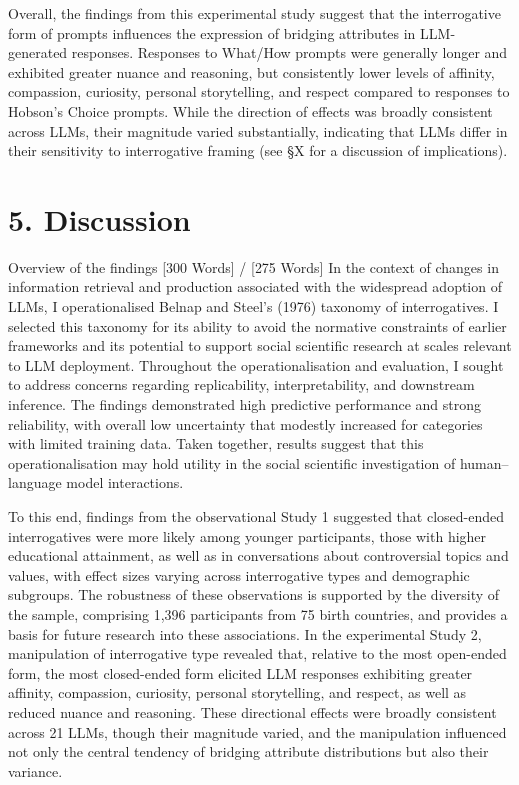\documentclass[
  12pt,
]{article}
\begin{document}
Overall, the findings from this experimental study suggest that the interrogative form of prompts influences the expression of bridging attributes in LLM-generated responses. Responses to What/How prompts were generally longer and exhibited greater nuance and reasoning, but consistently lower levels of affinity, compassion, curiosity, personal storytelling, and respect compared to responses to Hobson's Choice prompts. While the direction of effects was broadly consistent across LLMs, their magnitude varied substantially, indicating that LLMs differ in their sensitivity to interrogative framing (see §X for a discussion of implications).

\section{5. Discussion}\label{discussion}

Overview of the findings {[}300 Words{]} / {[}275 Words{]}
In the context of changes in information retrieval and production associated with the widespread adoption of LLMs, I operationalised Belnap and Steel's (1976) taxonomy of interrogatives. I selected this taxonomy for its ability to avoid the normative constraints of earlier frameworks and its potential to support social scientific research at scales relevant to LLM deployment. Throughout the operationalisation and evaluation, I sought to address concerns regarding replicability, interpretability, and downstream inference. The findings demonstrated high predictive performance and strong reliability, with overall low uncertainty that modestly increased for categories with limited training data. Taken together, results suggest that this operationalisation may hold utility in the social scientific investigation of human--language model interactions.

To this end, findings from the observational Study 1 suggested that closed-ended interrogatives were more likely among younger participants, those with higher educational attainment, as well as in conversations about controversial topics and values, with effect sizes varying across interrogative types and demographic subgroups. The robustness of these observations is supported by the diversity of the sample, comprising 1,396 participants from 75 birth countries, and provides a basis for future research into these associations. In the experimental Study 2, manipulation of interrogative type revealed that, relative to the most open-ended form, the most closed-ended form elicited LLM responses exhibiting greater affinity, compassion, curiosity, personal storytelling, and respect, as well as reduced nuance and reasoning. These directional effects were broadly consistent across 21 LLMs, though their magnitude varied, and the manipulation influenced not only the central tendency of bridging attribute distributions but also their variance.
\end{document}

